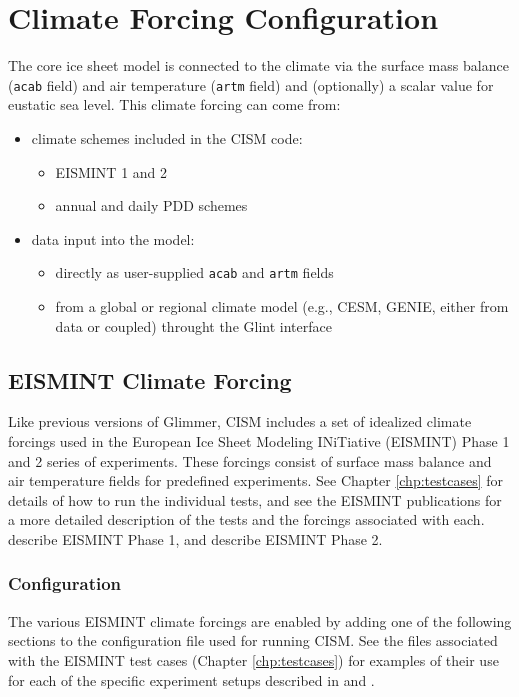 \section{Climate Forcing Configuration}
The core ice sheet model is connected to the climate via the surface mass balance (\texttt{acab} field) 
and air temperature (\texttt{artm} field) and (optionally) a scalar value for eustatic sea level. 
This climate forcing can come from:
\begin{itemize}
  \item  climate schemes included in the CISM code:
    \begin{itemize}
      \item EISMINT 1 and 2
      \item annual and daily PDD schemes
    \end{itemize}

  \item  data input into the model:
    \begin{itemize}
      \item directly as user-supplied \texttt{acab} and \texttt{artm} fields
      \item from a global or regional climate model (e.g., CESM, GENIE, either from data or coupled) throught the Glint interface
    \end{itemize}
\end{itemize}



%
\subsection{EISMINT Climate Forcing}\label{driver:eismint}
Like previous versions of Glimmer, CISM includes a set of idealized climate forcings used in the 
European Ice Sheet Modeling INiTiative (EISMINT) Phase 1 and 2
series of experiments.  These forcings consist of surface mass balance and 
air temperature fields for predefined experiments.  See Chapter \ref{chp:testcases}
for details of how to run the individual tests, and see the EISMINT publications
for a more detailed description of the tests and the forcings associated with each.
\citet{Huybrechts1996} describe EISMINT Phase 1, and \citet{Payne2000} describe EISMINT Phase 2.

\subsubsection{Configuration}
The various EISMINT climate forcings are enabled by adding one of the following
sections to the configuration file used for running CISM.  See the files associated
with the EISMINT test cases (Chapter \ref{chp:testcases}) for examples of their use
for each of the specific experiment setups described in \citet{Huybrechts1996} and \citet{Payne2000}.

